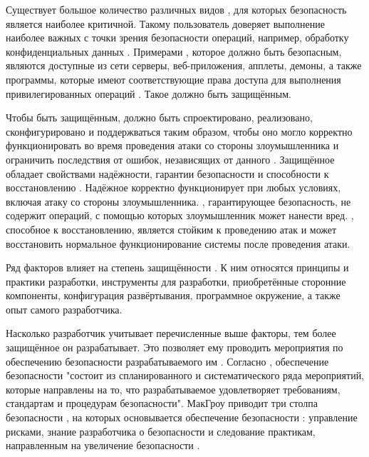 %
Существует большое количество различных видов , для которых безопасность является наиболее критичной. 
%
Такому  пользователь доверяет выполнение наиболее важных с точки зрения безопасности операций, например, обработку конфиденциальных данных . 
%
Примерами , которое должно быть безопасным, являются доступные из сети серверы, веб-приложения, апплеты, демоны, а также программы, которые имеют соответствующие права доступа для выполнения привилегированных операций . 
%
Такое  должно быть защищённым.

%
Чтобы быть защищённым,  должно быть спроектировано, реализовано, сконфигурировано и поддержваться таким образом, чтобы оно могло корректно функционировать во время проведения атаки со стороны злоумышленника и ограничить последствия от ошибок, независящих от данного  . 
%
Защищённое  обладает свойствами надёжности, гарантии безопасности и способности к восстановлению . 
%
Надёжное  корректно функционирует при любых условиях, включая атаку со стороны злоумышленника. 
%
, гарантирующее безопасность, не содержит операций, с помощью которых злоумышленник может нанести вред. 
%
, способное к восстановлению, является стойким к проведению атак и может восстановить нормальное функционирование системы после проведения атаки.

%
Ряд факторов влияет на степень защищённости  . 
%
К ним относятся принципы и практики разработки, инструменты для разработки, приобретённые сторонние компоненты, конфигурация развёртывания, программное окружение, а также опыт самого разработчика.

%
Насколько разработчик учитывает перечисленные выше факторы, тем более защищённое  он разрабатывает. 
%
Это позволяет ему проводить мероприятия по обеспечению безопасности разрабатываемого им . 
%
Согласно , обеспечение безопасности  "состоит из спланированного и систематического ряда мероприятий, которые направлены на то, что разрабатываемое  удовлетворяет требованиям, стандартам и процедурам безопасности".
%
МакГроу приводит три столпа безопасности , на которых основывается обеспечение безопасности : управление рисками, знание разработчика о безопасности и следование практикам, направленным на увеличение безопасности .

